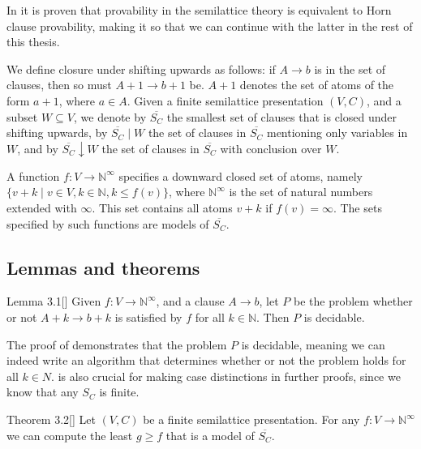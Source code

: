 
In \cite[Theorem 2.2,~p.~3]{mbezem} it is proven that provability in the semilattice theory
is equivalent to Horn clause provability, making it so that we can continue with the latter in the rest of this thesis.

We define closure under shifting upwards as follows:
if $A \rightarrow b$ is in the set of clauses, then so must $A + 1 \rightarrow b + 1$ be.
$A + 1$ denotes the set of atoms of the form $a + 1$, where $a \in A$.
Given a finite semilattice presentation $(V, C)$,
and a subset $W \subseteq V$, we denote by
$\overline{S_C}$ the smallest set of clauses that is closed under shifting upwards,
by $\overline{S_C} \mid W$ the set of clauses in $\overline{S_C}$
mentioning only variables in $W$, and by $\overline{S_C} \downarrow W$
the set of clauses in $\overline{S_C}$ with conclusion over $W$.

A function $f : V \rightarrow \mathbb{N}^{\infty}$ specifies a downward closed set of atoms,
namely $\{v + k \mid v \in V, k \in \mathbb{N}, k \le f(v)\}$,
where $\mathbb{N}^{\infty}$ is the set of natural numbers extended with $\infty$.
This set contains all atoms $v + k$ if $f(v) = \infty$.
The sets specified by such functions are models of $\overline{S_C}$.

\subsection{Lemmas and theorems}
\label{ssec:lemmas_and_theorems}

\begin{customlem}{Lemma 3.1}[{\cite[p.~3]{mbezem}}]
\label{lem:3.1}
Given $f : V \rightarrow \mathbb{N}^{\infty}$,
and a clause $A \rightarrow b$, let $P$ be the problem whether or not
$A + k \rightarrow b + k$ is satisfied by $f$ for all $k \in \mathbb{N}$.
Then $P$ is decidable.
\end{customlem}

The proof of  demonstrates that the problem $P$
is decidable, meaning we can indeed write an algorithm that
determines whether or not the problem holds for all $k \in N$.
 is also crucial for making case distinctions
in further proofs, since we know that any $S_C$ is finite.

\begin{customthm}{Theorem 3.2}[{\cite[p.~3]{mbezem}}]
\label{thm:3.2}
Let $(V, C)$ be a finite semilattice presentation.
For any $f : V \rightarrow \mathbb{N}^{\infty}$
we can compute the least $g \ge f$ that is a model of $\overline{S_C}$.
\end{customthm}

